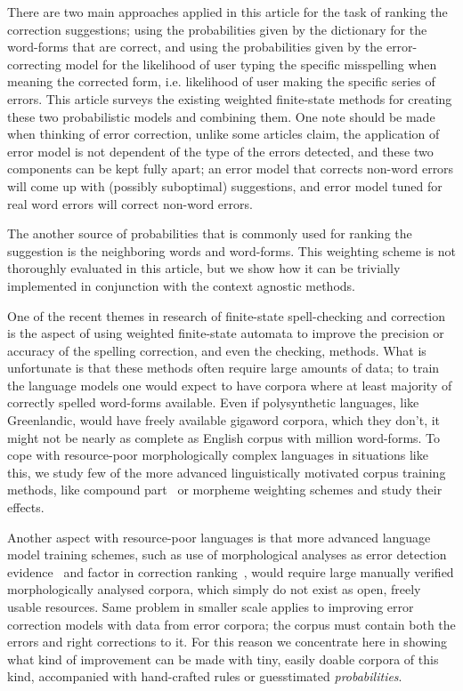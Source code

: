 \documentclass[a4paper,12pt]{article}
\begin{document}
There are two main approaches applied in this article for the task of ranking
the correction suggestions; using the probabilities given by the dictionary for
the word-forms that are correct, and using the probabilities given by the
error-correcting model for the likelihood of user typing the specific
misspelling when meaning the corrected form, i.e. likelihood of user making
the specific series of errors. This article surveys the existing
weighted finite-state methods for creating these two probabilistic models and
combining them. One note should be made when thinking of error correction,
unlike some articles claim, the application of error model is not dependent
of the type of the errors detected, and these two components can be kept fully
apart; an error model that corrects non-word errors will come up with (possibly
suboptimal) suggestions, and error model tuned for real word errors will
correct non-word errors.

The another source of probabilities that is commonly used
\cite[]{pirinen2012improving,otero/2007} for ranking the suggestion is the
neighboring words and word-forms. This weighting scheme is not thoroughly
evaluated in this article, but we show how it can be trivially implemented in
conjunction with the context agnostic methods.

One of the recent themes in research of finite-state spell-checking and
correction is the aspect of using weighted finite-state automata to improve the
precision or accuracy of the spelling correction, and even the checking,
methods. What is unfortunate is that these methods often require large amounts
of data; to train the language models one would expect to have corpora where at
least majority of correctly spelled word-forms available. Even if polysynthetic
languages, like Greenlandic, would have freely available gigaword corpora,
which they don't, it might not be nearly as complete as English corpus with
million word-forms. To cope with resource-poor morphologically complex
languages in situations like this, we study few of the more advanced
linguistically motivated corpus training methods, like compound
part~\cite[]{pirinen/2009/nodalida} or morpheme weighting schemes and study
their effects.

Another aspect with resource-poor languages is that more advanced language
model training schemes, such as use of morphological analyses as error
detection evidence~\cite[]{mays/1991} and factor in correction
ranking~\cite[]{otero/2007}, would require large manually verified
morphologically analysed corpora, which simply do not exist as open, freely
usable resources. Same problem in smaller scale applies to improving error
correction models with data from error corpora; the corpus must contain both
the errors and right corrections to it. For this reason we concentrate here in
showing what kind of improvement can be made with tiny, easily doable corpora
of this kind, accompanied with hand-crafted rules or guesstimated
\emph{probabilities}.
\end{document}

